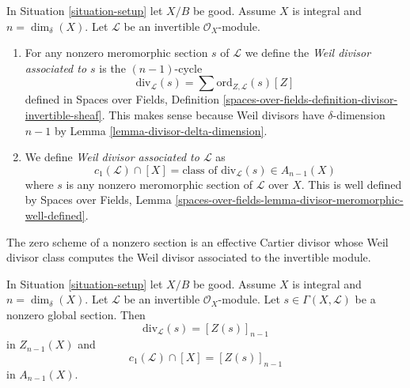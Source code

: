 \begin{definition}
\label{definition-divisor-invertible-sheaf}
In Situation \ref{situation-setup} let $X/B$ be good.
Assume $X$ is integral and $n = \dim_\delta(X)$.
Let $\mathcal{L}$ be an invertible $\mathcal{O}_X$-module.
\begin{enumerate}
\item For any nonzero meromorphic section $s$ of $\mathcal{L}$
we define the {\it Weil divisor associated to $s$} is the
$(n - 1)$-cycle
$$
\text{div}_\mathcal{L}(s) =
\sum \text{ord}_{Z, \mathcal{L}}(s) [Z]
$$
defined in Spaces over Fields, Definition
\ref{spaces-over-fields-definition-divisor-invertible-sheaf}.
This makes sense because Weil divisors have $\delta$-dimension $n - 1$
by Lemma \ref{lemma-divisor-delta-dimension}.
\item We define {\it Weil divisor associated to $\mathcal{L}$} as
$$
c_1(\mathcal{L}) \cap [X] =
\text{class of }\text{div}_\mathcal{L}(s) \in A_{n - 1}(X)
$$
where $s$ is any nonzero meromorphic section of $\mathcal{L}$ over
$X$. This is well defined by
Spaces over Fields, Lemma
\ref{spaces-over-fields-lemma-divisor-meromorphic-well-defined}.
\end{enumerate}
\end{definition}

\noindent
The zero scheme of a nonzero section is an effective Cartier divisor
whose Weil divisor class computes the Weil divisor associated to
the invertible module.

\begin{lemma}
\label{lemma-compute-c1}
In Situation \ref{situation-setup} let $X/B$ be good.
Assume $X$ is integral and $n = \dim_\delta(X)$.
Let $\mathcal{L}$ be an invertible $\mathcal{O}_X$-module.
Let $s \in \Gamma(X, \mathcal{L})$ be a nonzero global section.
Then
$$
\text{div}_\mathcal{L}(s) = [Z(s)]_{n - 1}
$$
in $Z_{n - 1}(X)$ and
$$
c_1(\mathcal{L}) \cap [X] = [Z(s)]_{n - 1}
$$
in $A_{n - 1}(X)$.
\end{lemma}

